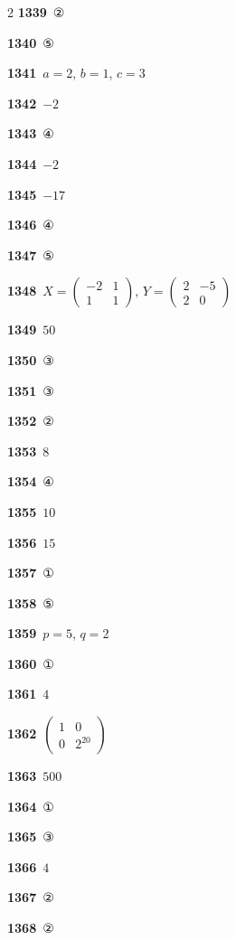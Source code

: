 \documentclass[10pt,a4paper]{article}
\begin{document}
\begin{multicols}{2}
\noindent\textbf{1339}\ ②\par
\noindent\textbf{1340}\ ⑤\par
\noindent\textbf{1341}\ $a=2$, $b=1$, $c=3$\par
\noindent\textbf{1342}\ $-2$\par
\noindent\textbf{1343}\ ④\par
\noindent\textbf{1344}\ $-2$\par
\noindent\textbf{1345}\ $-17$\par
\noindent\textbf{1346}\ ④\par
\noindent\textbf{1347}\ ⑤\par
\noindent\textbf{1348}\ $X=\begin{pmatrix} -2 & 1 \\ 1 & 1 \end{pmatrix}$, $Y=\begin{pmatrix} 2 & -5 \\ 2 & 0 \end{pmatrix}$\par
\noindent\textbf{1349}\ $50$\par
\noindent\textbf{1350}\ ③\par
\noindent\textbf{1351}\ ③\par
\noindent\textbf{1352}\ ②\par
\noindent\textbf{1353}\ $8$\par
\noindent\textbf{1354}\ ④\par
\noindent\textbf{1355}\ $10$\par
\noindent\textbf{1356}\ $15$\par
\noindent\textbf{1357}\ ①\par
\noindent\textbf{1358}\ ⑤\par
\noindent\textbf{1359}\ $p=5$, $q=2$\par
\noindent\textbf{1360}\ ①\par
\noindent\textbf{1361}\ $4$\par
\noindent\textbf{1362}\ $\begin{pmatrix} 1 & 0 \\ 0 & 2^{20} \end{pmatrix}$\par
\noindent\textbf{1363}\ $500$\par
\noindent\textbf{1364}\ ①\par
\noindent\textbf{1365}\ ③\par
\noindent\textbf{1366}\ $4$\par
\noindent\textbf{1367}\ ②\par
\noindent\textbf{1368}\ ②\par

\end{multicols}
\end{document}
